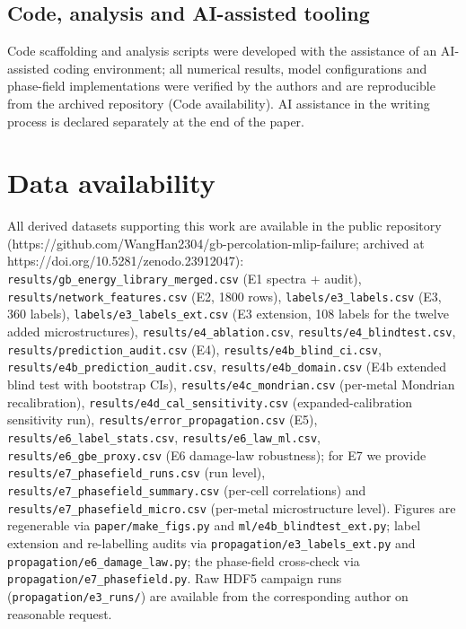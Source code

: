 \documentclass[12pt]{article}
\begin{document}
\subsection{Code, analysis and AI-assisted tooling}
Code scaffolding and analysis scripts were developed with the assistance of an AI-assisted coding environment; all numerical results, model configurations and phase-field implementations were verified by the authors and are reproducible from the archived repository (Code availability). AI assistance in the writing process is declared separately at the end of the paper.

\section*{Data availability}

{\sloppy
All derived datasets supporting this work are available in the public repository (\mbox{https://github.com/WangHan2304/gb-percolation-mlip-failure}; archived at \mbox{https://doi.org/10.5281/zenodo.23912047}): \texttt{results/gb\_energy\_library\_merged.csv} (E1 spectra + audit), \texttt{results/network\_features.csv} (E2, 1800 rows), \texttt{labels/e3\_labels.csv} (E3, 360 labels), \texttt{labels/e3\_labels\_ext.csv} (E3 extension, 108 labels for the twelve added microstructures), \texttt{results/e4\_ablation.csv}, \texttt{results/e4\_blindtest.csv}, \texttt{results/prediction\_audit.csv} (E4), \texttt{results/e4b\_blind\_ci.csv}, \texttt{results/e4b\_prediction\_audit.csv}, \texttt{results/e4b\_domain.csv} (E4b extended blind test with bootstrap CIs), \texttt{results/e4c\_mondrian.csv} (per-metal Mondrian recalibration), \texttt{results/e4d\_cal\_sensitivity.csv} (expanded-calibration sensitivity run), \texttt{results/error\_propagation.csv} (E5), \texttt{results/e6\_label\_stats.csv}, \texttt{results/e6\_law\_ml.csv}, \texttt{results/e6\_gbe\_proxy.csv} (E6 damage-law robustness); for E7 we provide \texttt{results/e7\_phasefield\_runs.csv} (run level), \texttt{results/e7\_phasefield\_summary.csv} (per-cell correlations) and \texttt{results/e7\_phasefield\_micro.csv} (per-metal microstructure level). Figures are regenerable via \texttt{paper/make\_figs.py} and \texttt{ml/e4b\_blindtest\_ext.py}; label extension and re-labelling audits via \texttt{propagation/e3\_labels\_ext.py} and \texttt{propagation/e6\_damage\_law.py}; the phase-field cross-check via \texttt{propagation/e7\_phasefield.py}. Raw HDF5 campaign runs (\texttt{propagation/e3\_runs/}) are available from the corresponding author on reasonable request.\par}
\end{document}
